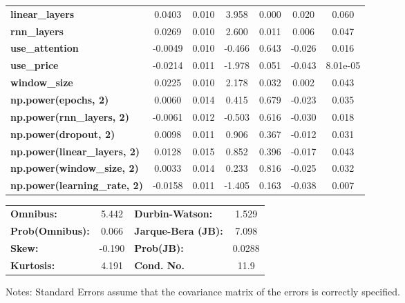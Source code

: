 \begin{center}
\begin{tabular}{lcccccc}
\textbf{linear\_layers}              &       0.0403  &        0.010     &     3.958  &         0.000        &        0.020    &        0.060     \\
\textbf{rnn\_layers}                 &       0.0269  &        0.010     &     2.600  &         0.011        &        0.006    &        0.047     \\
\textbf{use\_attention}              &      -0.0049  &        0.010     &    -0.466  &         0.643        &       -0.026    &        0.016     \\
\textbf{use\_price}                  &      -0.0214  &        0.011     &    -1.978  &         0.051        &       -0.043    &     8.01e-05     \\
\textbf{window\_size}                &       0.0225  &        0.010     &     2.178  &         0.032        &        0.002    &        0.043     \\
\textbf{np.power(epochs, 2)}         &       0.0060  &        0.014     &     0.415  &         0.679        &       -0.023    &        0.035     \\
\textbf{np.power(rnn\_layers, 2)}    &      -0.0061  &        0.012     &    -0.503  &         0.616        &       -0.030    &        0.018     \\
\textbf{np.power(dropout, 2)}        &       0.0098  &        0.011     &     0.906  &         0.367        &       -0.012    &        0.031     \\
\textbf{np.power(linear\_layers, 2)} &       0.0128  &        0.015     &     0.852  &         0.396        &       -0.017    &        0.043     \\
\textbf{np.power(window\_size, 2)}   &       0.0033  &        0.014     &     0.233  &         0.816        &       -0.025    &        0.032     \\
\textbf{np.power(learning\_rate, 2)} &      -0.0158  &        0.011     &    -1.405  &         0.163        &       -0.038    &        0.007     \\
\bottomrule
\end{tabular}
\begin{tabular}{lclc}
\textbf{Omnibus:}       &  5.442 & \textbf{  Durbin-Watson:     } &    1.529  \\
\textbf{Prob(Omnibus):} &  0.066 & \textbf{  Jarque-Bera (JB):  } &    7.098  \\
\textbf{Skew:}          & -0.190 & \textbf{  Prob(JB):          } &   0.0288  \\
\textbf{Kurtosis:}      &  4.191 & \textbf{  Cond. No.          } &     11.9  \\
\bottomrule
\end{tabular}
\end{center}

Notes: \newline
 [1] Standard Errors assume that the covariance matrix of the errors is correctly specified.